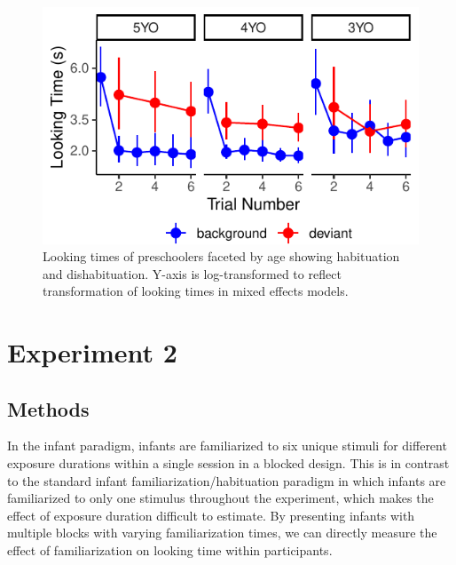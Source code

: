 \documentclass[10pt, letterpaper]{article}
\newenvironment{CodeChunk}{}{}
\begin{document}
\captionsetup{skip=4pt}

\begin{CodeChunk}
\begin{figure}[t!]

\includegraphics{figs/unnamed-chunk-13-1} \hfill{}

\caption[Looking times of preschoolers faceted by age showing habituation and dishabituation]{Looking times of preschoolers faceted by age showing habituation and dishabituation. Y-axis is log-transformed to reflect transformation of looking times in mixed effects models.}\label{fig:unnamed-chunk-13}
\end{figure}
\end{CodeChunk}

\hypertarget{experiment-2}{%
\section{Experiment 2}\label{experiment-2}}

\hypertarget{methods-1}{%
\subsection{Methods}\label{methods-1}}

In the infant paradigm, infants are familiarized to six unique stimuli
for different exposure durations within a single session in a blocked
design. This is in contrast to the standard infant
familiarization/habituation paradigm in which infants are familiarized
to only one stimulus throughout the experiment, which makes the effect
of exposure duration difficult to estimate. By presenting infants with
multiple blocks with varying familiarization times, we can directly
measure the effect of familiarization on looking time within
participants.
\end{document}
